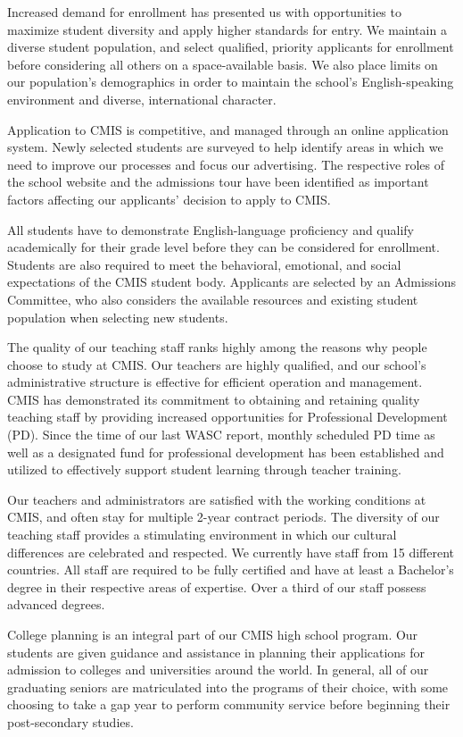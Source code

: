 Increased demand for enrollment has presented us with opportunities to maximize student diversity and apply higher standards for entry. We maintain a diverse student population, and select qualified, priority applicants for enrollment before considering all others on a space-available basis. We also place limits on our population's demographics in order to maintain the school's English-speaking environment and diverse, international character. 
 
Application to CMIS is competitive, and managed through an online application system. Newly selected students are surveyed to help identify areas in which we need to improve our processes and focus our advertising. The respective roles of the school website and the admissions tour have been identified as important factors affecting our applicants' decision to apply to CMIS. 

All students have to demonstrate English-language proficiency and qualify academically for their grade level before they can be considered for enrollment. Students are also required to meet the behavioral, emotional, and social expectations of the CMIS student body. Applicants are selected by an Admissions Committee, who also considers the available resources and existing student population when selecting new students.  

The quality of our teaching staff ranks highly among the reasons why people choose to study at CMIS. Our teachers are highly qualified, and our school's administrative structure is effective for efficient operation and management. CMIS has demonstrated its commitment to obtaining and retaining quality teaching staff by providing increased opportunities for Professional Development (PD). Since the time of our last WASC report, monthly scheduled PD time as well as a designated fund for professional development has been established and utilized to effectively support student learning through teacher training.

Our teachers and administrators are satisfied with the working conditions at CMIS, and often stay for multiple 2-year contract periods. The diversity of our teaching staff provides a stimulating environment in which our cultural differences are celebrated and respected. We currently have staff from 15 different countries. All staff are required to be fully certified and have at least a Bachelor's degree in their respective areas of expertise. Over a third of our staff possess advanced degrees.

College planning is an integral part of our CMIS high school program. Our students are given guidance and assistance in planning their applications for admission to colleges and universities around the world. In general, all of our graduating seniors are matriculated into the programs of their choice, with some choosing to take a gap year to perform community service before beginning their post-secondary studies. 

